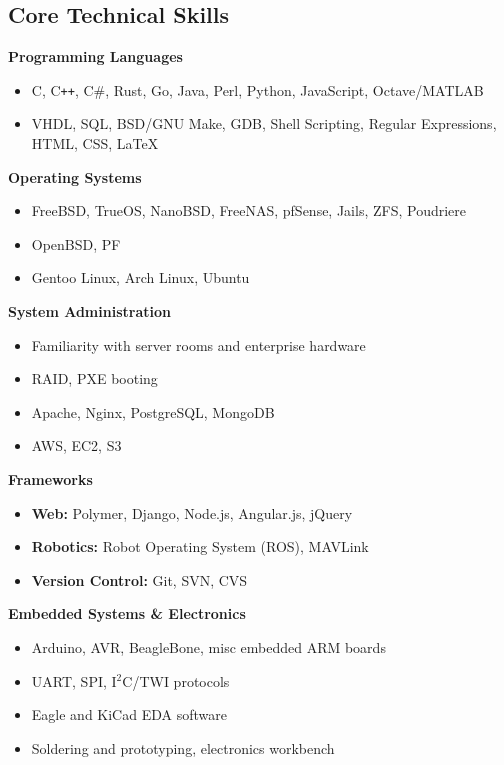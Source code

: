 \documentclass[10pt,letterpaper]{article}
\begin{document}
\subsection*{Core Technical Skills}
    \textbf{Programming Languages}
    \begin{itemize}[label=--]
        \item C, C\texttt{++}, C\#, Rust, Go, Java, Perl, Python, JavaScript,
            Octave/MATLAB
        \item VHDL, SQL, BSD/GNU Make, GDB, Shell Scripting, Regular
            Expressions, HTML, CSS, \LaTeX%
    \end{itemize}
    \textbf{Operating Systems}
    \begin{itemize}[label=--]
        \item FreeBSD, TrueOS, NanoBSD, FreeNAS, pfSense, Jails, ZFS, Poudriere
        \item OpenBSD, PF
        \item Gentoo Linux, Arch Linux, Ubuntu
    \end{itemize}
    \textbf{System Administration}
    \begin{itemize}[label=--]
        \item Familiarity with server rooms and enterprise hardware
        \item RAID, PXE booting
        \item Apache, Nginx, PostgreSQL, MongoDB
        \item AWS, EC2, S3
    \end{itemize}
    \textbf{Frameworks}
    \begin{itemize}[label=--]
        \item \textbf{Web:} Polymer, Django, Node.js, Angular.js, jQuery
        \item \textbf{Robotics:} Robot Operating System (ROS), MAVLink
        \item \textbf{Version Control:} Git, SVN, CVS
    \end{itemize}
    \textbf{Embedded Systems \& Electronics}
    \begin{itemize}[label=--]
        \item Arduino, AVR, BeagleBone, misc embedded ARM boards
        \item UART, SPI, I$^2$C/TWI protocols
        \item Eagle and KiCad EDA software
        \item Soldering and prototyping, electronics workbench
    \end{itemize}
\end{document}
